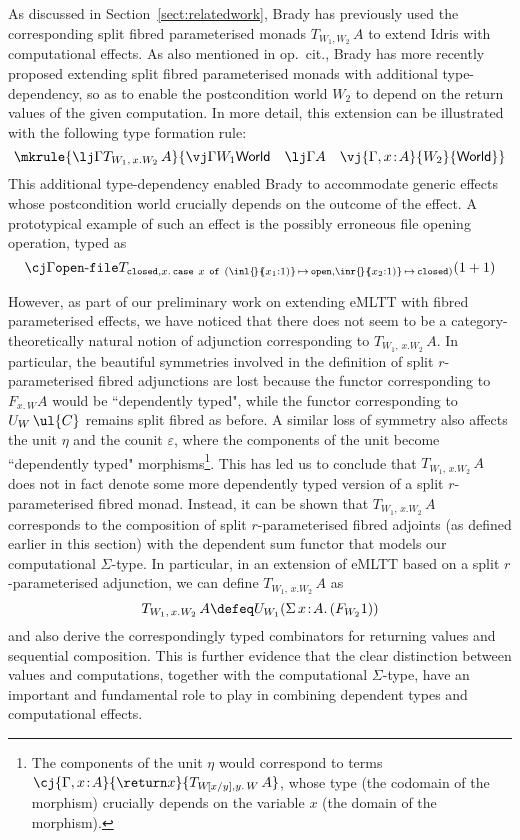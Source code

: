 As discussed in Section~\ref{sect:relatedwork}, Brady has previously used the corresponding split fibred  parameterised monads $T_{W_1,W_2}\, A$ to extend Idris with computational effects.
As also mentioned in op.~cit., Brady has more recently proposed extending split fibred parameterised monads with additional type-dependency, so as to enable the postcondition world $W_2$ to depend on the return values of the given computation. In more detail, this extension can be illustrated with the following type formation rule:
\vspace{0.25cm}
\[
\mkrule
{\lj \Gamma {T_{W_1,\, x.W_2}\, A}}
{
\vj \Gamma {W_1} {\mathsf{World}}
\quad
\lj \Gamma A
\quad
\vj {\Gamma, x \!:\! A} {W_2} {\mathsf{World}}
}
\]
%
This additional type-dependency enabled Brady to accommodate generic effects whose postcondition world crucially depends on the outcome of the effect. 
A prototypical example of such an effect is the possibly erroneous file opening operation, typed as
\[
{\cj \Gamma {\mathtt{open\text{-}file}} {T_{\mathtt{closed},x.\,\mathtt{case~} x \mathtt{~of} \mathtt{~} ({\inl {\!} {\!\!(x_1 : 1)} \,\mapsto\, \mathtt{open}}, {\inr {\!} {\!\!(x_2 : 1)} \,\mapsto\, \mathtt{closed}})}(1+1)}}
\]
%

However, as part of our preliminary work on extending eMLTT with fibred parameterised effects, we have noticed that there does not seem to be a category-theoretically natural notion of adjunction corresponding to $T_{W_1,\, x.W_2}\, A$. In particular, the beautiful symmetries involved in the definition of split $r$-parameterised fibred adjunctions are lost because the functor corresponding to $F_{x.\, W} A$ would be   ``dependently typed", while the functor corresponding to $U_W\, \ul{C}$ remains split fibred as before.
A similar loss of symmetry also affects the unit $\eta$ and the counit $\varepsilon$, where the components of the unit become ``dependently typed" morphisms\footnote{The components of the unit $\eta$ would correspond to terms $\cj {\Gamma,x\!:\!A} {\return x} {T_{W\![x/y],y.\, W}\, A}$, whose type (the codomain of the morphism) crucially depends on the variable $x$ (the domain of the morphism).}.
This has led us to conclude that $T_{W_1,\, x.W_2}\, A$ does not in fact denote some more dependently typed version of a split $r$-parameterised fibred monad. Instead, it can be shown that $T_{W_1,\, x.W_2}\, A$ corresponds to the composition of split $r$-parameterised fibred adjoints (as defined earlier in this section) with the dependent sum functor that models our computational $\Sigma$-type. In particular, in an extension of eMLTT based on a split $r$-parameterised adjunction, we can define  $T_{W_1,\, x.W_2}\, A$ as 
\[
T_{W_1,\, x.W_2}\, A \defeq U_{W_1} (\Sigma\, x \!:\! A .\, (F_{W_2} 1))
\]
and also derive the correspondingly typed combinators for returning values and sequential composition. This is further evidence that the clear distinction between values and computations, together with the computational $\Sigma$-type, have an important and fundamental role to play in combining dependent types and computational effects.


